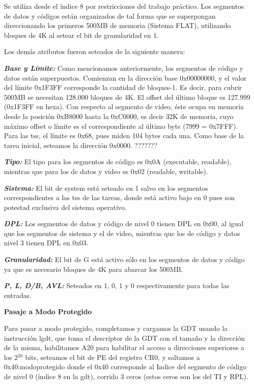 \documentclass[a4paper]{article}
\begin{document}
\par Se utiliza desde el índice 8 por restricciones del trabajo práctico.
Los segmentos de datos y códigos están organizados de tal forma que se superpongan direccionando los primeros 500MB de memoria (Sistema FLAT), utilizando bloques de 4K al setear el bit de granularidad en 1.
\par Los demás atributos fueron seteados de la siguiente manera:
\par \textbf{\emph{Base y Límite: } }Como mencionamos anteriormente, los segmentos de código y datos están superpuestos. Comienzan en la dirección base 0x00000000, y el valor del límite 0x1F3FF corresponde la cantidad de bloques-1. Es decir, para cubrir 500MB se necesitan 128.000 bloques de 4K. El offset del último bloque es 127.999 (0x1F3FF en hexa).
Con respecto al segmento de video, éste ocupa en memoria desde la posición 0xB8000 hasta la 0xC0000, es decir 32K de memoria, cuyo máximo offset o límite es el correspondiente al último byte (7999 = 0x7FFF).
Para las tss, el límite es 0x68, pues miden 104 bytes cada una. Como base de la tarea inicial, seteamos la dirección 0x0000. ???????
\par \emph{\textbf{Tipo: }} El tipo para los segmentos de código es 0x0A (executable, readable), mientras que para los de datos y video es 0x02 (readable, writable).
\par \emph{\textbf{Sistema: }} El bit de system está seteado en 1 salvo en los segmentos correspondientes a las tss de las tareas, donde está activo bajo en 0 pues son potestad exclusiva del sistema operativo.
\par \emph{\textbf{DPL: }} Los segmentos de datos y código de nivel 0 tienen DPL en 0x00, al igual que los segmentos de sistema y el de video, mientras que los de código y datos nivel 3 tienen DPL en 0x03.
\par \emph{\textbf{Granularidad: }} El bit de G está activo sólo en los segmentos de datos y código ya que es necesario bloques de 4K para abarcar los 500MB.
\par \emph{\textbf{P, L, D/B, AVL: } }Seteados en 1, 0, 1 y 0 respectivamente para todas las entradas.
\newline

\textbf{Pasaje a Modo Protegido}

\par Para pasar a modo protegido, completamos y cargamos la GDT usando la instrucción lgdt, que toma el descriptor de la GDT con el tamaño y la dirección de la misma, habilitamos A20 para habilitar el acceso a direcciones superiores a los 2$^{20}$ bits, seteamos el bit de PE del registro CR0, y saltamos a 0x40:modoprotegido donde el 0x40 corresponde al Indice del segmento de código de nivel 0 (índice 8 en la gdt), corrido 3 ceros (estos ceros son los del TI y RPL).
\end{document}
